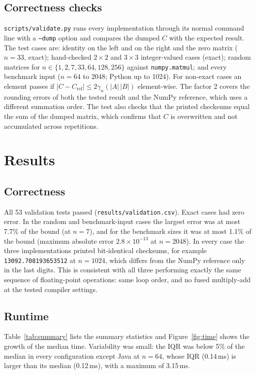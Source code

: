 \documentclass[11pt,a4paper]{article}
\begin{document}
\subsection{Correctness checks}\label{sec:validation}
\texttt{scripts/validate.py} runs every implementation through its normal command line with a
\texttt{--dump} option and compares the dumped $C$ with the expected result. The test cases are:
identity on the left and on the right and the zero matrix ($n = 33$, exact); hand-checked
$2\times2$ and $3\times3$ integer-valued cases (exact); random matrices for
$n \in \{1, 2, 7, 33, 64, 128, 256\}$ against \texttt{numpy.matmul}; and every benchmark input
($n = 64$ to $2048$; Python up to 1024). For non-exact cases an element passes if
$|C - C_{\text{ref}}| \le 2\gamma_n(|A|\,|B|)$ element-wise. The factor 2 covers the rounding errors
of both the tested result and the NumPy reference, which uses a different summation order. The test also checks that the
printed checksums equal the sum of the dumped matrix, which confirms that $C$ is overwritten and not
accumulated across repetitions.

\section{Results}

\subsection{Correctness}
All 53 validation tests passed (\texttt{results/validation.csv}). Exact cases had zero error. In
the random and benchmark-input cases the largest error was at most 7.7\% of the bound (at $n = 7$),
and for the benchmark sizes it was at most 1.1\% of the bound (maximum absolute error
$2.8\times10^{-13}$ at $n = 2048$). In every case the three implementations printed bit-identical
checksums, for example \texttt{13092.708193653512} at $n = 1024$, which differs from the NumPy reference only in
the last digits. This is consistent with all three performing exactly the same sequence of
floating-point operations: same loop order, and no fused multiply-add at the tested compiler settings.

\subsection{Runtime}
Table~\ref{tab:summary} lists the summary statistics and Figure~\ref{fig:time} shows the
growth of the median time. Variability was small: the IQR was below 5\% of the median in every
configuration except Java at $n = 64$, whose IQR (0.14\,ms) is larger than its median (0.12\,ms),
with a maximum of 3.15\,ms.
\end{document}
